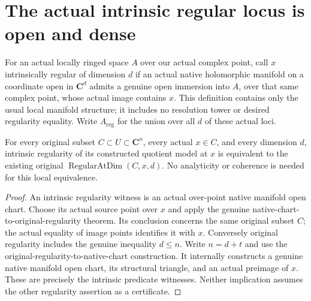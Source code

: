 \section{The actual intrinsic regular locus is open and dense}

For an actual locally ringed space $A$ over our actual complex point, call
$x$ intrinsically regular of dimension $d$ if an actual native holomorphic
manifold on a coordinate open in $\mathbf C^d$ admits a genuine open
immersion into $A$, over that same complex point, whose actual image
contains $x$. This definition contains only the usual local manifold
structure; it includes no resolution tower or desired regularity equality.
Write $A_{\mathrm{reg}}$ for the union over all $d$ of these actual loci.

\begin{theorem}
\label{hir:intrinsic-complex-analytic-regularity-original-dictionary}
\leanok
For every original subset $C\subset U\subset\mathbf C^n$, every actual
$x\in C$, and every dimension $d$, intrinsic regularity of its constructed
quotient model at $x$ is equivalent to the existing original
$\operatorname{RegularAtDim}(C,x,d)$. No analyticity or coherence is needed
for this local equivalence.
\end{theorem}
\begin{proof}
An intrinsic regularity witness is an actual over-point native manifold
open chart. Choose its actual source point over $x$ and apply the genuine
native-chart-to-original-regularity theorem. Its conclusion concerns the
same original subset $C$; the actual equality of image points identifies
it with $x$. Conversely original regularity includes the genuine inequality
$d\le n$. Write $n=d+t$ and use the original-regularity-to-native-chart
construction. It internally constructs a genuine native manifold open chart,
its structural triangle, and an actual preimage of $x$. These are precisely
the intrinsic predicate witnesses. Neither implication assumes the other
regularity assertion as a certificate.
\end{proof}

